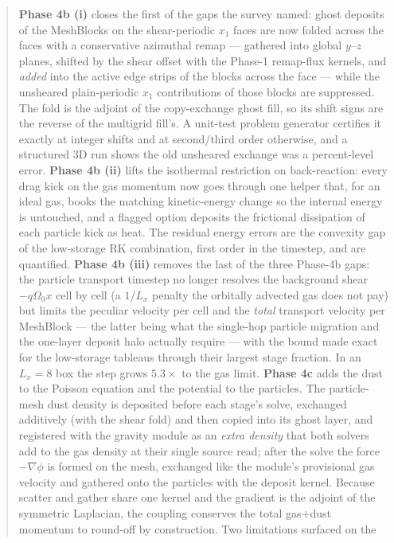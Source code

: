 \documentclass[11pt]{article}
\newcommand{\Om}{\Omega_0}
\newcommand{\qom}{q\Om}
\begin{document}
\begin{abstract}
\textbf{Phase 4b (i)} closes the first of the gaps the survey named: ghost
deposits of the MeshBlocks on the shear-periodic $x_1$ faces are now folded across the
faces with a conservative azimuthal remap --- gathered into global $y$--$z$ planes,
shifted by the shear offset with the Phase-1 remap-flux kernels, and \emph{added} into
the active edge strips of the blocks across the face --- while the unsheared
plain-periodic $x_1$ contributions of those blocks are suppressed. The fold is the
adjoint of the copy-exchange ghost fill, so its shift signs are the reverse of the
multigrid fill's. A unit-test problem generator certifies it exactly at integer shifts
and at second/third order otherwise, and a structured 3D run shows the old unsheared
exchange was a percent-level error. \textbf{Phase 4b (ii)} lifts the isothermal
restriction on back-reaction: every drag kick on the gas momentum now goes through one
helper that, for an ideal gas, books the matching kinetic-energy change so the internal
energy is untouched, and a flagged option deposits the frictional dissipation of each
particle kick as heat. The residual energy errors are the convexity gap of the
low-storage RK combination, first order in the timestep, and are quantified.
\textbf{Phase 4b (iii)} removes the last of the three Phase-4b gaps: the particle
transport timestep no longer resolves the background shear $-\qom x$ cell by cell (a
$1/L_x$ penalty the orbitally advected gas does not pay) but limits the peculiar
velocity per cell and the \emph{total} transport velocity per MeshBlock --- the latter
being what the single-hop particle migration and the one-layer deposit halo actually
require --- with the bound made exact for the low-storage tableaus through their largest
stage fraction. In an $L_x = 8$ box the step grows $5.3\times$ to the gas limit.
\textbf{Phase 4c} adds the dust to the Poisson equation and the potential to the
particles. The particle-mesh dust density is deposited before each stage's solve,
exchanged additively (with the shear fold) and then copied into its ghost layer, and
registered with the gravity module as an \emph{extra density} that both solvers add to
the gas density at their single source read; after the solve the force $-\nabla\phi$ is
formed on the mesh, exchanged like the module's provisional gas velocity and gathered
onto the particles with the deposit kernel. Because scatter and gather share one kernel
and the gradient is the adjoint of the symmetric Laplacian, the coupling conserves the
total gas$+$dust momentum to round-off by construction. Two limitations surfaced on the

\end{abstract}
\end{document}
